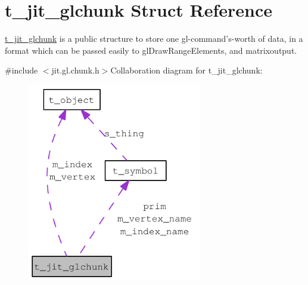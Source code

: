 \hypertarget{structt__jit__glchunk}{
\section{t\_\-jit\_\-glchunk Struct Reference}
\label{structt__jit__glchunk}
}


\hyperlink{structt__jit__glchunk}{t\_\-jit\_\-glchunk} is a public structure to store one gl-\/command's-\/worth of data, in a format which can be passed easily to glDrawRangeElements, and matrixoutput.  


{\ttfamily \#include $<$jit.gl.chunk.h$>$}Collaboration diagram for t\_\-jit\_\-glchunk:\nopagebreak
\begin{figure}[H]
\begin{center}
\leavevmode
\includegraphics[width=215pt]{structt__jit__glchunk__coll__graph}
\end{center}
\end{figure}
